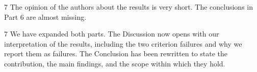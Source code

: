 \begin{reviewcomment}{7}
	The opinion of the authors about the results is very short. The conclusions in Part 6 are almost missing.
\end{reviewcomment}

\begin{reviewresponse}{7}
	We have expanded both parts.
	The Discussion now opens with our interpretation of the results, including the two criterion failures and why we report them as failures.
	The Conclusion has been rewritten to state the contribution, the main findings, and the scope within which they hold.

\end{reviewresponse}
